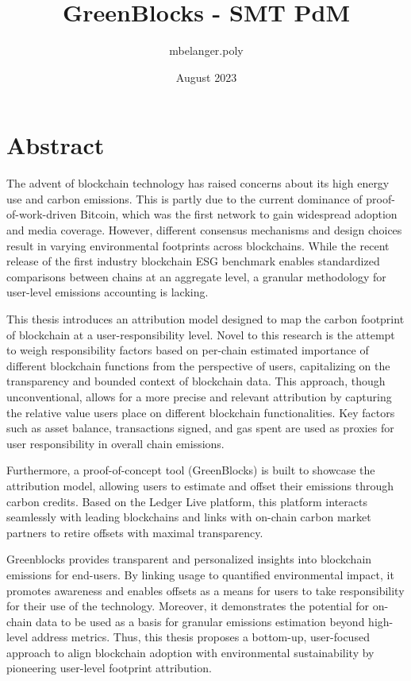 \documentclass[11pt]{report}
\title{GreenBlocks - SMT PdM}
\author{mbelanger.poly}
\date{August 2023}
\begin{document}

\section*{Abstract}

The advent of blockchain technology has raised concerns about its high energy use and carbon emissions. This is partly due to the current dominance of proof-of-work-driven Bitcoin, which was the first network to gain widespread adoption and media coverage. However, different consensus mechanisms and design choices result in varying environmental footprints across blockchains. While the recent release of the first industry blockchain ESG benchmark enables standardized comparisons between chains at an aggregate level, a granular methodology for user-level emissions accounting is lacking.

This thesis introduces an attribution model designed to map the carbon footprint of blockchain at a user-responsibility level. Novel to this research is the attempt to weigh responsibility factors based on  per-chain estimated importance of different blockchain functions from the perspective of users, capitalizing on the transparency and bounded context of blockchain data. This approach, though unconventional, allows for a more precise and relevant attribution by capturing the relative value users place on different blockchain functionalities. Key factors such as asset balance, transactions signed, and gas spent are used as proxies for user responsibility in overall chain emissions.


Furthermore, a proof-of-concept tool (GreenBlocks) is built to showcase the attribution model, allowing users
to estimate and offset their emissions through carbon credits. Based on the Ledger Live platform, this
platform interacts seamlessly with leading blockchains and links with on-chain carbon market partners to retire
offsets with maximal transparency.

Greenblocks provides transparent and personalized insights into blockchain emissions for end-users. By
linking usage to quantified environmental impact, it promotes awareness and enables offsets as a means for
users to take responsibility for their use of the technology. Moreover, it demonstrates the potential for
on-chain data to be used as a basis for granular emissions estimation beyond high-level address metrics.
Thus, this thesis proposes a bottom-up, user-focused approach to align blockchain adoption with environmental
sustainability by pioneering user-level footprint attribution.
\end{document}
